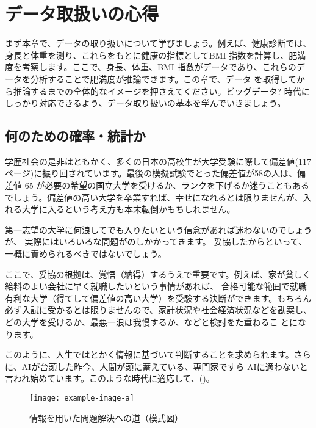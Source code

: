 \chapter{データ取扱いの心得}

\begin{chapintro}
    まず本章で、データの取り扱いについて学びましょう。例えば、健康診断では、身長と体重を測り、これらをもとに健康の指標としてBMI 指数を計算し、肥満度を考察します。ここで、身長、体重、BMI 指数がデータであり、これらのデータを分析することで肥満度が推論できます。この章で、データ を取得してから推論するまでの全体的なイメージを押さえてください。ビッグデータ? 時代にしっかり対応できるよう、データ取り扱いの基本を学んでいきましょう。
\end{chapintro}

\section{何のための確率・統計か}
学歴社会の是非はともかく、多くの日本の高校生が大学受験に際して偏差値(117 ページ)に振り回されています。最後の模擬試験でとった偏差値が58の人は、偏差値 65 が必要の希望の国立大学を受けるか、ランクを下げるか迷うこともあるでしょう。偏差値の高い大学を卒業すれば、幸せになれるとは限りませんが、入れる大学に入るという考え方も本末転倒かもちしれません。

第一志望の大学に何浪してでも入りたいという信念があれば迷わないのでしょうが、 実際にはいろいろな間題がのしかかってきます。 妥協したからとい\nobreak って、一概に責められるべきではないでしょう。

ここで、妥協の根拠は、覚悟（納得）するうえで重要です。例えば、家が貧しく給料のよい会社に早く就職したいという事情があれば、 合格可能な範囲で就職有利な大学（得てして偏差値の高い大学）を受験する決断ができます。もちろん必ず入試に受かるとは限りませんので、家計状況や社会経済状況などを勘案し、どの大学を受けるか、最悪一浪は我慢するか、などと検討をた重ねるこ
とになります。

このように、人生ではとかく情報に基づいて判断することを求められます。さらに、AIが台頭した昨今、人間が頭に蓄えている、専門家ですら AIに適わないと言われ始めています。このような時代に適応して、()。

\begin{figure}[h]
    \centering
    \texttt{[image: example-image-a]}
    \caption{情報を用いた問題解決への道（模式図）\label{fig:chart}}
\end{figure}

